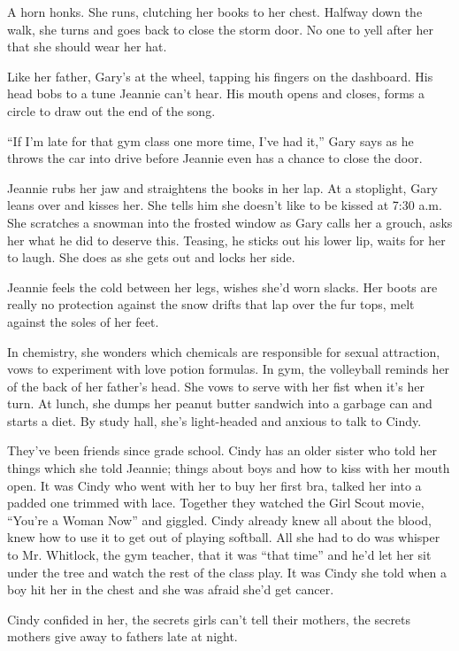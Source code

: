 \documentclass[twoside,10pt]{book}
\begin{document}
A horn honks. She runs, clutching her books to her chest. Halfway down
the walk, she turns and goes back to close the storm door. No one to
yell after her that she should wear her hat.

Like her father, Gary's at the wheel, tapping his fingers on the
dashboard. His head bobs to a tune Jeannie can't hear. His mouth opens
and closes, forms a circle to draw out the end of the song.

``If I'm late for that gym class one more time, I've had it,'' Gary says
as he throws the car into drive before Jeannie even has a chance to
close the door.

Jeannie rubs her jaw and straightens the books in her lap. At a
stoplight, Gary leans over and kisses her. She tells him she doesn't
like to be kissed at 7:30 a.m. She scratches a snowman into the frosted
window as Gary calls her a grouch, asks her what he did to deserve this.
Teasing, he sticks out his lower lip, waits for her to laugh. She does
as she gets out and locks her side.

Jeannie feels the cold between her legs, wishes she'd worn slacks. Her
boots are really no pro­tection against the snow drifts that lap over
the fur tops, melt against the soles of her feet.

In chemistry, she wonders which chemicals are responsible for sexual
attraction, vows to exper­iment with love potion formulas. In gym, the
volleyball reminds her of the back of her father's head. She vows to
serve with her fist when it's her turn. At lunch, she dumps her peanut
butter sandwich into a garbage can and starts a diet. By study hall,
she's light-headed and anxious to talk to Cindy.

They've been friends since grade school. Cindy has an older sister who
told her things which she told Jeannie; things about boys and how to
kiss with her mouth open. It was Cindy who went with her to buy her
first bra, talked her into a padded one trimmed with lace. Together they
watched the Girl Scout movie, ``You're a Woman Now'' and giggled. Cindy
already knew all about the blood, knew how to use it to get out of
playing softball. All she had to do was whisper to Mr. Whitlock, the gym
teacher, that it was ``that time'' and he'd let her sit under the tree
and watch the rest of the class play. It was Cindy she told when a boy
hit her in the chest and she was afraid she'd get cancer.

Cindy confided in her, the secrets girls can't tell their mothers, the
secrets mothers give away to fathers late at night.
\end{document}
